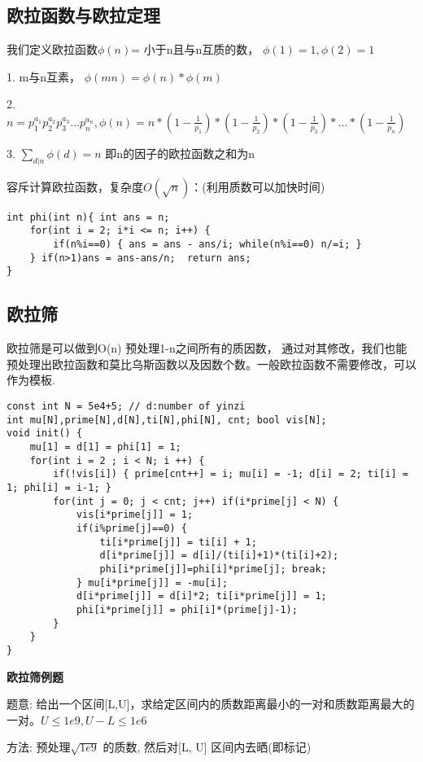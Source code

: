 \subsection{欧拉函数与欧拉定理}

我们定义欧拉函数$\phi (n) $= 小于n且与n互质的数， $\phi(1) = 1, \phi(2) = 1$

1. m与n互素， $\phi(mn)=\phi(n)*\phi(m)$ 

2. $n = p_1^{a_1} p_2^{a_2} p_3^{a_3}... p_n^{a_n}, \phi(n) = n*(1 - \frac{1}{p_1})*(1 - \frac{1}{p_2})*(1 - \frac{1}{p_3})*...*(1 - \frac{1}{p_n}) $

3. $\sum_{d|n} \phi(d) = n$ 即n的因子的欧拉函数之和为n

容斥计算欧拉函数，复杂度$O(\sqrt{n})$：(利用质数可以加快时间)

\begin{lstlisting}
int phi(int n){ int ans = n;
    for(int i = 2; i*i <= n; i++) {
        if(n%i==0) { ans = ans - ans/i; while(n%i==0) n/=i; }
    } if(n>1)ans = ans-ans/n;  return ans;
}
\end{lstlisting}

\subsection{欧拉筛}
欧拉筛是可以做到O(n) 预处理1-n之间所有的质因数， 通过对其修改，我们也能预处理出欧拉函数和莫比乌斯函数以及因数个数。一般欧拉函数不需要修改，可以作为模板.

\begin{lstlisting}
const int N = 5e4+5; // d:number of yinzi
int mu[N],prime[N],d[N],ti[N],phi[N], cnt; bool vis[N];
void init() {
    mu[1] = d[1] = phi[1] = 1; 
    for(int i = 2 ; i < N; i ++) {
        if(!vis[i]) { prime[cnt++] = i; mu[i] = -1; d[i] = 2; ti[i] = 1; phi[i] = i-1; } 
        for(int j = 0; j < cnt; j++) if(i*prime[j] < N) {
            vis[i*prime[j]] = 1;
            if(i%prime[j]==0) {
                ti[i*prime[j]] = ti[i] + 1;
                d[i*prime[j]] = d[i]/(ti[i]+1)*(ti[i]+2);
                phi[i*prime[j]]=phi[i]*prime[j]; break;
            } mu[i*prime[j]] = -mu[i];
            d[i*prime[j]] = d[i]*2; ti[i*prime[j]] = 1;
            phi[i*prime[j]] = phi[i]*(prime[j]-1);
        }
    }
}
\end{lstlisting}
{\bfseries 欧拉筛例题}

题意: 给出一个区间[L,U]，求给定区间内的质数距离最小的一对和质数距离最大的一对。$U \le 1e9, U-L \le 1e6$

方法: 预处理$\sqrt{1e9}$  的质数, 然后对[L, U] 区间内去晒(即标记)

